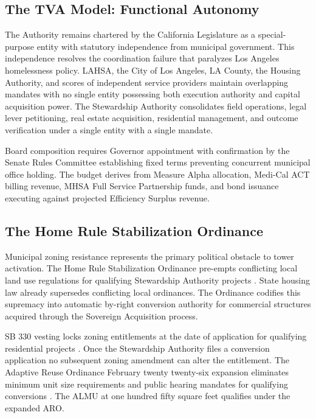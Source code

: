 \documentclass[12pt, letterpaper]{article}
\begin{document}
\subsection{The TVA Model: Functional Autonomy}

The Authority remains chartered by the California Legislature as a special-purpose entity with statutory independence from municipal government. This independence resolves the coordination failure that paralyzes Los Angeles homelessness policy. LAHSA, the City of Los Angeles, LA County, the Housing Authority, and scores of independent service providers maintain overlapping mandates with no single entity possessing both execution authority and capital acquisition power. The Stewardship Authority consolidates field operations, legal lever petitioning, real estate acquisition, residential management, and outcome verification under a single entity with a single mandate.

Board composition requires Governor appointment with confirmation by the Senate Rules Committee establishing fixed terms preventing concurrent municipal office holding. The budget derives from Measure Alpha allocation, Medi-Cal ACT billing revenue, MHSA Full Service Partnership funds, and bond issuance executing against projected Efficiency Surplus revenue.

\subsection{The Home Rule Stabilization Ordinance}

Municipal zoning resistance represents the primary political obstacle to tower activation. The Home Rule Stabilization Ordinance pre-empts conflicting local land use regulations for qualifying Stewardship Authority projects \citep{holland_knight_2025}. State housing law already supersedes conflicting local ordinances. The Ordinance codifies this supremacy into automatic by-right conversion authority for commercial structures acquired through the Sovereign Acquisition process.

SB 330 vesting locks zoning entitlements at the date of application for qualifying residential projects \citep{la_planning_sb330_2026}. Once the Stewardship Authority files a conversion application no subsequent zoning amendment can alter the entitlement. The Adaptive Reuse Ordinance February twenty twenty-six expansion eliminates minimum unit size requirements and public hearing mandates for qualifying conversions \citep{la_planning_aro_2026}. The ALMU at one hundred fifty square feet qualifies under the expanded ARO.
\end{document}

